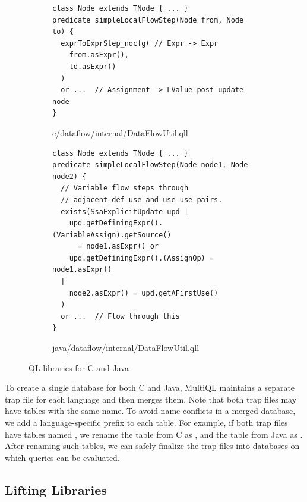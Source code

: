 \begin{figure}[t]
  \centering
  \vspace{2mm}
  \begin{subfigure}[t]{0.5\textwidth}
\begin{lstlisting}[style=codeql,xleftmargin=2.5em]
class Node extends TNode { ... }
predicate simpleLocalFlowStep(Node from, Node to) {
  exprToExprStep_nocfg( // Expr -> Expr
    from.asExpr(),
    to.asExpr()
  )
  or ...  // Assignment -> LValue post-update node
}
\end{lstlisting}
    \vspace*{-.5em}
    \caption{c/dataflow/internal/DataFlowUtil.qll}
  \end{subfigure}
  \begin{subfigure}[t]{0.5\textwidth}
\begin{lstlisting}[style=codeql,xleftmargin=2.5em]
class Node extends TNode { ... }
predicate simpleLocalFlowStep(Node node1, Node node2) {
  // Variable flow steps through
  // adjacent def-use and use-use pairs.
  exists(SsaExplicitUpdate upd |
    upd.getDefiningExpr().(VariableAssign).getSource()
      = node1.asExpr() or
    upd.getDefiningExpr().(AssignOp) = node1.asExpr()
  |
    node2.asExpr() = upd.getAFirstUse()
  )
  or ...  // Flow through this
}
\end{lstlisting}
    \vspace*{-.5em}
    \caption{java/dataflow/internal/DataFlowUtil.qll}
  \end{subfigure}
  \vspace*{-.5em}
  \caption{QL libraries for C and Java}
  \label{fig:qll}
\end{figure}

To create a single database for both C and Java, MultiQL maintains
a separate trap file for each language and then merges them.
Note that both trap files may have tables with the same name.
To avoid name conflicts in a merged database, we add a
language-specific prefix to each table.
For example, if both trap files have tables named ,
we rename the table from C as ,
and the table from Java as .
After renaming such tables, we can safely finalize the trap files into
databases on which queries can be evaluated.

\subsection{Lifting Libraries}

